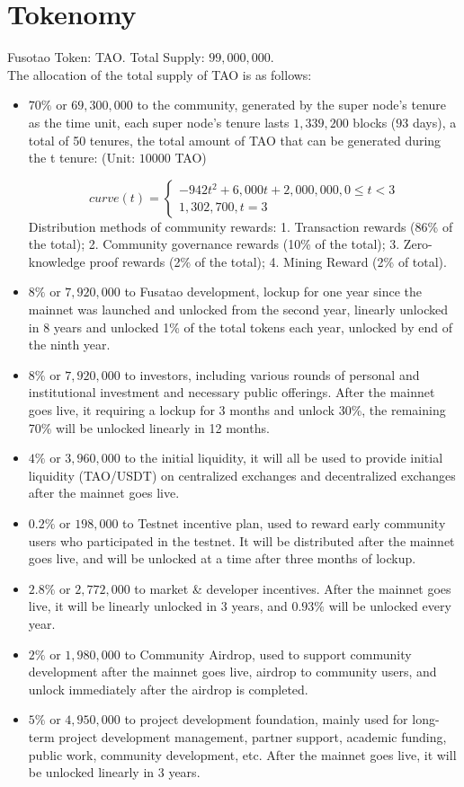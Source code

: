 \documentclass[a4paper,12pt]{article}
\begin{document}
\section{Tokenomy}
\label{sec:2}
Fusotao Token: TAO. Total Supply: $99,000,000$.\\
The allocation of the total supply of TAO is as follows:
\begin{itemize}
    \item $70\%$ or $69,300,000$ to the community, generated by the super node’s tenure as the time unit, each super node’s tenure lasts $1,339,200$ blocks ($93$ days), a total of 50 tenures, the total amount of TAO that can be generated during the t tenure: (Unit: $10000$ TAO)


\begin{equation*}
    curve(t)=\left\{\begin{matrix} -942t^2+6,000t+2,000,000, 0\leq t < 3 
        \\ 1,302,700, t = 3
\end{matrix}\right.
\end{equation*}
    Distribution methods of community rewards: 1. Transaction rewards (86\% of the total); 2. Community governance rewards (10\% of the total); 3. Zero-knowledge proof rewards (2\% of the total); 4. Mining Reward (2\% of total).

    \item $8\%$ or $7,920,000$ to Fusatao development, lockup for one year since the mainnet was launched and unlocked from the second year, linearly unlocked in 8 years and unlocked 1\% of the total tokens each year, unlocked by end of the ninth year.
    \item $8\%$ or $7,920,000$ to investors, including various rounds of personal and institutional investment and necessary public offerings. After the mainnet goes live, it requiring a lockup for 3 months and unlock 30\%, the remaining 70\% will be unlocked linearly in 12 months.
    \item $4\%$ or $3,960,000$ to the initial liquidity, it will all be used to provide initial liquidity (TAO/USDT) on centralized exchanges and decentralized exchanges after the mainnet goes live.
    \item $0.2\%$ or $198,000$ to Testnet incentive plan, used to reward early community users who participated in the testnet. It will be distributed after the mainnet goes live, and will be unlocked at a time after three months of lockup.
    \item $2.8\%$ or $2,772,000$ to market \& developer incentives. After the mainnet goes live, it will be linearly unlocked in 3 years, and $0.93\%$ will be unlocked every year.
    \item $2\%$ or $1,980,000$ to Community Airdrop, used to support community development after the mainnet goes live, airdrop to community users, and unlock immediately after the airdrop is completed.
    \item $5\%$ or $4,950,000$ to project development foundation, mainly used for long-term project development management, partner support, academic funding, public work, community development, etc. After the mainnet goes live, it will be unlocked linearly in 3 years.
\end{itemize}
\end{document}
